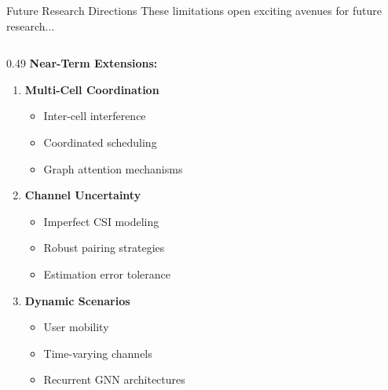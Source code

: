 \documentclass[aspectratio=169]{beamer}
\begin{document}
\begin{frame}{Future Research Directions}
    \vspace{-0.3cm}
    \small \textcolor{iiitblue}{These limitations open exciting avenues for future research...}
    
    \vspace{0.05cm}
    
    \begin{columns}[T]
        \begin{column}{0.49\textwidth}
            \textbf{Near-Term Extensions:}
            \begin{enumerate}\itemsep0.15em
                \item \textbf{Multi-Cell Coordination}
                \begin{itemize}\itemsep0em
                    \item Inter-cell interference
                    \item Coordinated scheduling
                    \item Graph attention mechanisms
                \end{itemize}
                
                \item \textbf{Channel Uncertainty}
                \begin{itemize}\itemsep0em
                    \item Imperfect CSI modeling
                    \item Robust pairing strategies
                    \item Estimation error tolerance
                \end{itemize}
                
                \item \textbf{Dynamic Scenarios}
                \begin{itemize}\itemsep0em
                    \item User mobility
                    \item Time-varying channels
                    \item Recurrent GNN architectures
                \end{itemize}
                

\end{enumerate}
\end{column}
\end{columns}
\end{frame}
\end{document}
